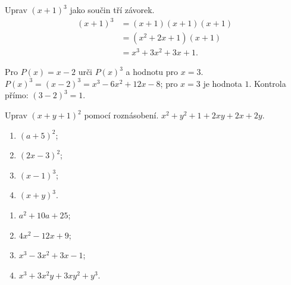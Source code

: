 \documentclass[11pt,a4paper]{article}
\begin{document}
\begin{prikladReseniBox}[title={Příklad 3}]
Uprav $(x+1)^3$ jako součin tří závorek.
\tcblower
\begin{align*}
(x+1)^3&=(x+1)(x+1)(x+1)\\
&=(x^2+2x+1)(x+1)\\
&=x^3+3x^2+3x+1.
\end{align*}
\end{prikladReseniBox}
\begin{prikladReseniBox}[title={Příklad 4}]
Pro $P(x)=x-2$ urči $P(x)^3$ a hodnotu pro $x=3$.
\tcblower
$P(x)^3=(x-2)^3=x^3-6x^2+12x-8$; pro $x=3$ je hodnota $1$. Kontrola přímo: $(3-2)^3=1$.
\end{prikladReseniBox}
\begin{zadaniReseniBox}[title={Rozšíření 1}]
Uprav $(x+y+1)^2$ pomocí roznásobení.
\tcblower
$x^2+y^2+1+2xy+2x+2y$.
\end{zadaniReseniBox}
\begin{zadaniReseniBox}[title={Domácí úkol}]
\begin{enumerate}[label=\alph*)]
\item $(a+5)^2$;
\item $(2x-3)^2$;
\item $(x-1)^3$;
\item $(x+y)^3$.
\end{enumerate}
\tcblower
\begin{enumerate}[label=\alph*)]
\item $a^2+10a+25$;
\item $4x^2-12x+9$;
\item $x^3-3x^2+3x-1$;
\item $x^3+3x^2y+3xy^2+y^3$.
\end{enumerate}
\end{zadaniReseniBox}
\end{document}
